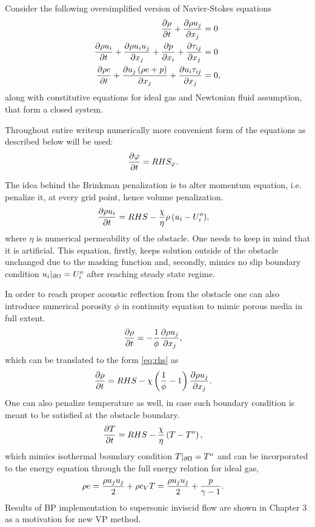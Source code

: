 Consider the following oversimplified version of Navier-Stokes equations
\begin{align}
\nonumber
\frac {\partial \rho}{\partial t} + \frac {\partial \rho u_j}{\partial x_j} &= 0 \\
\frac {\partial \rho u_i}{\partial t} + \frac {\partial \rho u_i u_j}{\partial x_j} + \frac {\partial p}{\partial x_i} + \frac {\partial \tau_{ij}}{\partial x_j} &= 0\\
\nonumber
\frac {\partial \rho e}{\partial t} + \frac {\partial u_j \left(\rho e + p\right)}{\partial x_j} + \frac {\partial u_i \tau_{ij}}{\partial x_j} &= 0,
\end{align}
along with constitutive equations for ideal gas and Newtonian fluid assumption, that form a closed system.

Throughout entire writeup numerically more convenient form of the equations as described below will be used:
\begin{align}
\frac {\partial \varphi}{\partial t} &= RHS_\varphi. \label{eq:rhs}
\end{align}

The idea behind the Brinkman penalization is to alter momentum equation, i.e. penalize it, at every grid point, hence volume penalization. 
\begin{align}
\frac {\partial \rho u_i}{\partial t} &= RHS - \frac \chi \eta {\rho \left(u_i - U_i^o\right)},
\end{align}
where $\eta$ is numerical permeability of the obstacle. One needs to keep in mind that it is artificial. This equation, firstly, keeps solution outside of the obstacle unchanged due to the masking function and, secondly, mimics no slip boundary condition $u_i|_{\partial \Omega} = U_i^o$ after reaching steady state regime. 

In order to reach proper acoustic reflection from the obstacle one can also introduce numerical porosity $\phi$ in continuity equation to mimic porous media in full extent.
\begin{align}
\nonumber
\frac {\partial \rho}{\partial t} &= -\frac 1\phi \frac {\partial \rho u_j}{\partial x_j},
\end{align}
which can be translated to the form \eqref{eq:rhs} as 
\begin{align}
\frac {\partial \rho}{\partial t} &= RHS - \chi \left(\frac 1\phi - 1\right) \frac {\partial \rho u_j}{\partial x_j}.
\end{align}
One can also penalize temperature as well, in case such boundary condition is meant to be satisfied at the obstacle boundary.
\begin{align}
\frac {\partial T}{\partial t} &= RHS - \frac \chi \eta \left(T - T^o\right),
\end{align}
which mimics isothermal boundary condition $T|_{\partial \Omega} = T^o$ and can be incorporated to the energy equation through the full energy relation for ideal gas,
\begin{align}
\rho e &= \frac {\rho u_j u_j}2 + \rho c_VT = \frac {\rho u_j u_j}2 + \frac p{\gamma - 1} \label{eq:igeos}.
\end{align}
Results of BP implementation to supersonic inviscid flow are shown in Chapter 3 as a motivation for new VP method.

